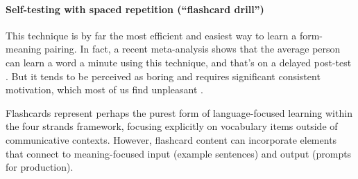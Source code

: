 \paragraph*{Self-testing with spaced repetition (``flashcard drill'')} This technique is by far the most efficient and easiest way to learn a form-meaning pairing. In fact, a recent meta-analysis shows that the average person can learn a word a minute using this technique, and that's on a delayed post-test \citep{webb2020}. But it tends to be perceived as boring and requires significant consistent motivation, which most of us find unpleasant \citep{David2024}.

Flashcards represent perhaps the purest form of language-focused learning within the four strands framework, focusing explicitly on vocabulary items outside of communicative contexts. However, flashcard content can incorporate elements that connect to meaning-focused input (example sentences) and output (prompts for production).

